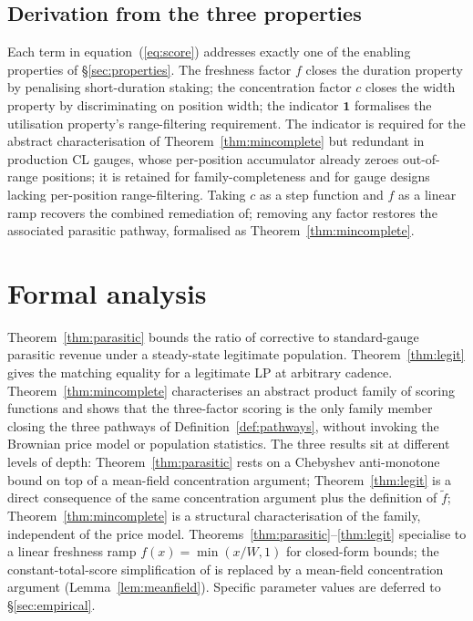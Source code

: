 \documentclass[11pt,a4paper]{article}
\theoremstyle{definition}
\theoremstyle{plain}
\theoremstyle{remark}
\begin{document}
\subsection{Derivation from the three properties}\label{sec:mapping}

Each term in equation~(\ref{eq:score}) addresses exactly one of the enabling properties of \S\ref{sec:properties}. The freshness factor $f$ closes the duration property by penalising short-duration staking; the concentration factor $c$ closes the width property by discriminating on position width; the indicator $\mathbf{1}$ formalises the utilisation property's range-filtering requirement. The indicator is required for the abstract characterisation of Theorem~\ref{thm:mincomplete} but redundant in production CL gauges, whose per-position accumulator already zeroes out-of-range positions; it is retained for family-completeness and for gauge designs lacking per-position range-filtering. Taking $c$ as a step function and $f$ as a linear ramp recovers the combined remediation of\cite{ryan2026c}; removing any factor restores the associated parasitic pathway, formalised as Theorem~\ref{thm:mincomplete}.

\section{Formal analysis}\label{sec:analysis}

Theorem~\ref{thm:parasitic} bounds the ratio of corrective to standard-gauge parasitic revenue under a steady-state legitimate population. Theorem~\ref{thm:legit} gives the matching equality for a legitimate LP at arbitrary cadence. Theorem~\ref{thm:mincomplete} characterises an abstract product family of scoring functions and shows that the three-factor scoring is the only family member closing the three pathways of Definition~\ref{def:pathways}, without invoking the Brownian price model or population statistics. The three results sit at different levels of depth: Theorem~\ref{thm:parasitic} rests on a Chebyshev anti-monotone bound on top of a mean-field concentration argument; Theorem~\ref{thm:legit} is a direct consequence of the same concentration argument plus the definition of $\tilde f$; Theorem~\ref{thm:mincomplete} is a structural characterisation of the family, independent of the price model. Theorems~\ref{thm:parasitic}--\ref{thm:legit} specialise to a linear freshness ramp $f(x) = \min(x/W, 1)$ for closed-form bounds; the constant-total-score simplification of\cite{ryan2026c} is replaced by a mean-field concentration argument (Lemma~\ref{lem:meanfield}). Specific parameter values are deferred to \S\ref{sec:empirical}.
\end{document}
